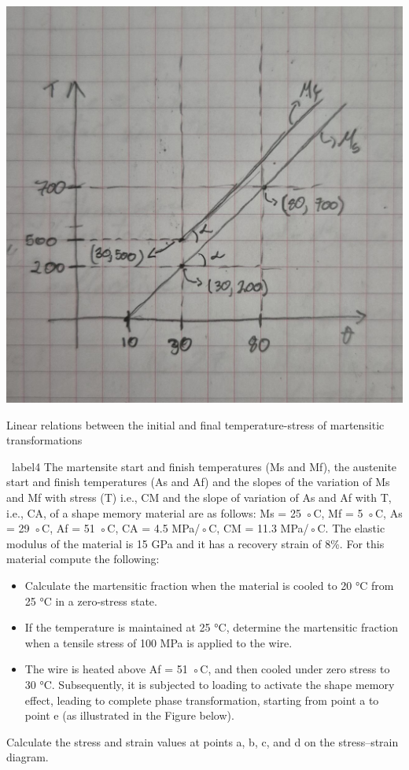 \documentclass[a4paper]{tufte-handout} %
\begin{document}
\begin{marginfigure} 
    \includegraphics{imgs/problem3.jpg}
    \caption{Linear relations between the initial and final temperature-stress of martensitic transformations}
\end{marginfigure}

\begin{prob}{~}{label4}
The martensite start and finish temperatures (Ms and Mf), the austenite start and finish temperatures (As and Af) and the slopes of the variation of Ms and Mf with stress (T) i.e., CM and the slope of variation of As and Af with T, i.e., CA, of a shape memory material are as follows: Ms = 25 ◦C, Mf = 5 ◦C, As = 29 ◦C, Af = 51 ◦C, CA = 4.5 MPa/◦C, CM = 11.3 MPa/◦C. 
The elastic modulus of the material is 15 GPa and it has a recovery strain of 8\%. 
For this material compute the following: 
\begin{itemize}
    \item Calculate the martensitic fraction when the material is cooled to 20 °C from 25 °C in a zero-stress state.
    \item If the temperature is maintained at 25 °C, determine the martensitic fraction when a tensile stress of 100 MPa is applied to the wire.
    \item The wire is heated above Af = 51 ◦C, and then cooled under zero stress to 30 °C. Subsequently, it is subjected to loading to activate the shape memory effect, leading to complete phase transformation, starting from point a to point e (as illustrated in the Figure below).
\end{itemize}
Calculate the stress and strain values at points a, b, c, and d on the stress–strain diagram.
\end{prob}
\end{document}
